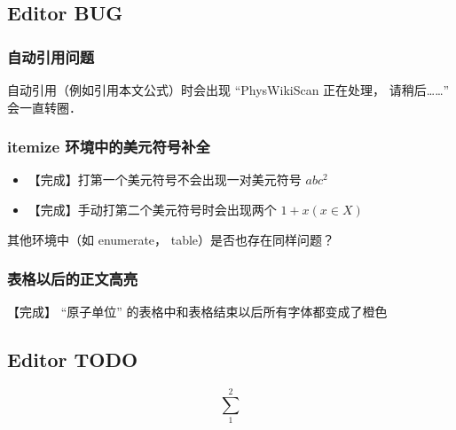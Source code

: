 
\subsection{Editor BUG}

\subsubsection{自动引用问题}
自动引用（例如引用本文公式）时会出现 “PhysWikiScan 正在处理， 请稍后……” 会一直转圈．

\subsubsection{itemize 环境中的美元符号补全}
\begin{itemize}
\item 【完成】打第一个美元符号不会出现一对美元符号 $abc^2$
\item 【完成】手动打第二个美元符号时会出现两个 $1 + x (x \in X)$
\end{itemize}
其他环境中（如 enumerate， table）是否也存在同样问题？

\subsubsection{表格以后的正文高亮}
【完成】 “原子单位” 的表格中和表格结束以后所有字体都变成了橙色

\subsection{Editor TODO}
\begin{equation}
\textstyle\sum_1^2
\end{equation}


